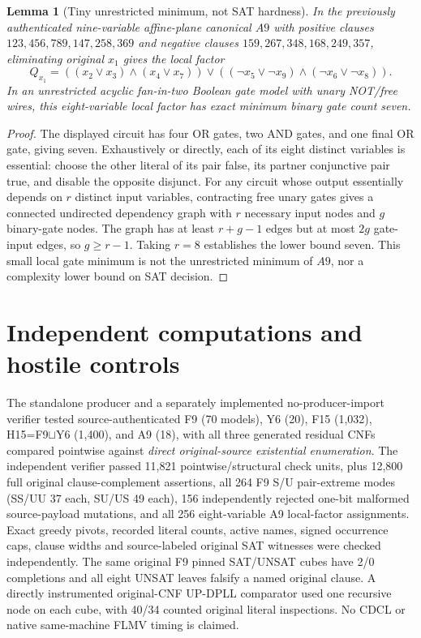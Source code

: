 \documentclass[11pt]{article}
\newtheorem{lemma}{Lemma}
\begin{document}
\begin{lemma}[Tiny unrestricted minimum, not SAT hardness]
In the previously authenticated nine-variable affine-plane canonical $A9$ with positive clauses $123,456,789,147,258,369$ and negative clauses $159,267,348,168,249,357$, eliminating original $x_1$ gives the local factor
\[
 Q_{x_1}=((x_2\lor x_3)\land(x_4\lor x_7))\lor
 ((\neg x_5\lor\neg x_9)\land(\neg x_6\lor\neg x_8)).
\]
In an \emph{unrestricted} acyclic fan-in-two Boolean gate model with unary NOT/free wires, this eight-variable local factor has exact minimum binary gate count seven.
\end{lemma}
\begin{proof}
The displayed circuit has four OR gates, two AND gates, and one final OR gate, giving seven. Exhaustively or directly, each of its eight distinct variables is essential: choose the other literal of its pair false, its partner conjunctive pair true, and disable the opposite disjunct. For any circuit whose output essentially depends on $r$ distinct input variables, contracting free unary gates gives a connected undirected dependency graph with $r$ necessary input nodes and $g$ binary-gate nodes. The graph has at least $r+g-1$ edges but at most $2g$ gate-input edges, so $g\ge r-1$. Taking $r=8$ establishes the lower bound seven. This small local gate minimum is not the unrestricted minimum of $A9$, nor a complexity lower bound on SAT decision.\end{proof}

\section{Independent computations and hostile controls}
The standalone producer and a separately implemented no-producer-import verifier tested source-authenticated F9 (70 models), Y6 (20), F15 (1,032), H15=F9\(\sqcup\)Y6 (1,400), and A9 (18), with all three generated residual CNFs compared pointwise against \emph{direct original-source existential enumeration}. The independent verifier passed 11,821 pointwise/structural check units, plus 12,800 full original clause-complement assertions, all 264 F9 S/U pair-extreme modes (SS/UU 37 each, SU/US 49 each), 156 independently rejected one-bit malformed source-payload mutations, and all 256 eight-variable A9 local-factor assignments. Exact greedy pivots, recorded literal counts, active names, signed occurrence caps, clause widths and source-labeled original SAT witnesses were checked independently. The same original F9 pinned SAT/UNSAT cubes have 2/0 completions and all eight UNSAT leaves falsify a named original clause. A directly instrumented original-CNF UP-DPLL comparator used one recursive node on each cube, with 40/34 counted original literal inspections. No CDCL or native same-machine FLMV timing is claimed.
\end{document}
